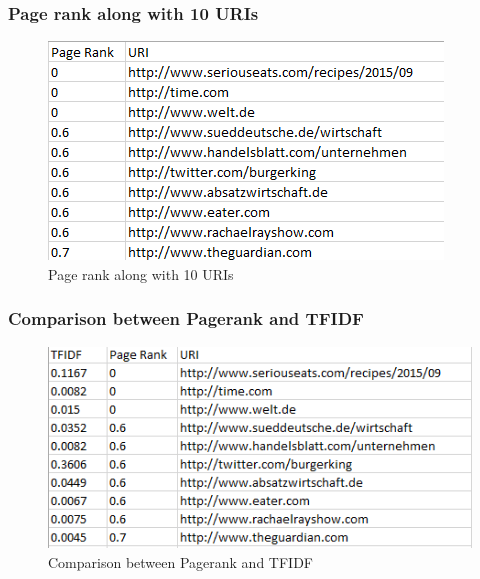 \subsubsection{Page rank along with 10 URIs}
\begin{figure}[ht]    
    \begin{center}
        \includegraphics[scale=0.80]{pagerank.png}
        \caption{Page rank along with 10 URIs}
        \label{Page rank along with 10 URIs}
    \end{center}
\end{figure}

\subsubsection{Comparison between Pagerank and TFIDF}
\begin{figure}[ht]    
    \begin{center}
        \includegraphics[scale=0.80]{pagerank_tfidf.png}
        \caption{Comparison between Pagerank and TFIDF}
        \label{Comparison between Pagerank and TFIDF}
    \end{center}
\end{figure}
\newpage

